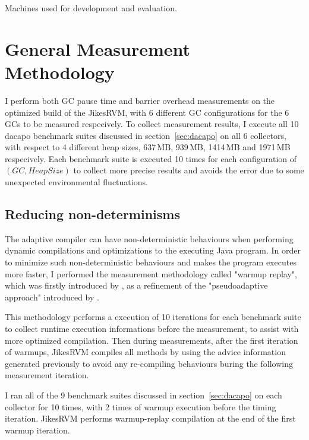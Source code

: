\begin{table*}
  \centering
  
  \caption{Machines used for development and evaluation.}
  \label{tab:machines}
\end{table*}

\section{General Measurement Methodology}
\label{sec:generalmethod}

I perform both GC pause time and barrier overhead measurements on the optimized build
of the JikesRVM, with 6 different GC configurations for the 6 GCs to be measured respecively.
To collect measurement results, I execute all 10 dacapo benchmark suites discussed in section~\ref{sec:dacapo}
on all 6 collectors, with respect to 4 different heap sizes, 637\,MB, 939\,MB, 1414\,MB and 1971\,MB
respecively. Each benchmark suite is executed 10 times for each configuration of $(GC, HeapSize)$ to
collect more precise results and avoids the error due to some unexpected environmental fluctuations.

\subsection{Reducing non-determinisms}
\label{subsec:nondeterminisms}

The adaptive compiler can have non-deterministic behaviours when performing dynamic
compilations and optimizations to the executing Java program. In order to minimize
such non-deterministic behaviours and makes the program executes more faster, I performed
the measurement methodology called "warmup replay", which was firstly introduced by
\cite{yang2012barriers}, as a refinement of the "pseudoadaptive approach" introduced by \cite{blackburn2004barriers}.

This methodology performs a execution of 10 iterations for each benchmark suite to
collect runtime execution informations before the measurement, to assist with more optimized compilation.
Then during measurements, after the first iteration of warmups, JikesRVM compiles all
methods by using the advice information generated previously to avoid any re-compiling
behaviours buring the following measurement iteration.

I ran all of the 9 benchmark suites discussed in section~\ref{sec:dacapo} on each collector
for 10 times, with 2 times of warmup execution before the timing iteration.
JikesRVM performs warmup-replay compilation at the end of the first warmup iteration.

